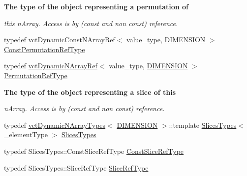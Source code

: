 \begin{Indent}{\bf The type of the object representing a permutation of}\par
{\em this n\+Array. Access is by (const and non const) reference. }\begin{DoxyCompactItemize}
\item 
typedef \hyperlink{classvct_dynamic_const_n_array_ref}{vct\+Dynamic\+Const\+N\+Array\+Ref}$<$ value\+\_\+type, \hyperlink{classvct_dynamic_const_n_array_base_a815ac316ebc1bb2ab1969d307549826faf759c9ab831ff929b89af4ea2865a378}{D\+I\+M\+E\+N\+S\+I\+O\+N} $>$ \hyperlink{classvct_dynamic_const_n_array_base_a412fcb88d50ea2e1d809efab113968fc}{Const\+Permutation\+Ref\+Type}
\item 
typedef \hyperlink{classvct_dynamic_n_array_ref}{vct\+Dynamic\+N\+Array\+Ref}$<$ value\+\_\+type, \hyperlink{classvct_dynamic_const_n_array_base_a815ac316ebc1bb2ab1969d307549826faf759c9ab831ff929b89af4ea2865a378}{D\+I\+M\+E\+N\+S\+I\+O\+N} $>$ \hyperlink{classvct_dynamic_const_n_array_base_a968acf814b972b47aa2ea39105e67fb3}{Permutation\+Ref\+Type}
\end{DoxyCompactItemize}
\end{Indent}
\begin{Indent}{\bf The type of the object representing a slice of this}\par
{\em n\+Array. Access is by (const and non const) reference. }\begin{DoxyCompactItemize}
\item 
typedef \hyperlink{classvct_dynamic_n_array_types}{vct\+Dynamic\+N\+Array\+Types}$<$ \hyperlink{classvct_dynamic_const_n_array_base_a815ac316ebc1bb2ab1969d307549826faf759c9ab831ff929b89af4ea2865a378}{D\+I\+M\+E\+N\+S\+I\+O\+N} $>$\+::template \hyperlink{classvct_dynamic_const_n_array_base_a1f4ce8ed9fda0d5d1704f66799a55279}{Slices\+Types}$<$ \+\_\+element\+Type $>$ \hyperlink{classvct_dynamic_const_n_array_base_a1f4ce8ed9fda0d5d1704f66799a55279}{Slices\+Types}
\item 
typedef Slices\+Types\+::\+Const\+Slice\+Ref\+Type \hyperlink{classvct_dynamic_const_n_array_base_ad4a09eb0789ba4c5b8d799fbe0ee3d79}{Const\+Slice\+Ref\+Type}
\item 
typedef Slices\+Types\+::\+Slice\+Ref\+Type \hyperlink{classvct_dynamic_const_n_array_base_a4170184942c320b2402ba8dfdab9a915}{Slice\+Ref\+Type}
\end{DoxyCompactItemize}
\end{Indent}
